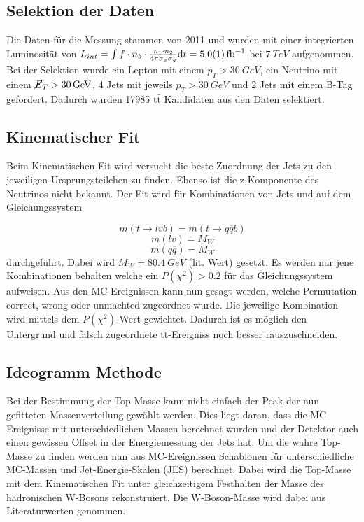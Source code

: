 \documentclass[a4paper]{article}
\begin{document}
\subsection{Selektion der Daten}
Die Daten für die Messung stammen von 2011 und wurden mit einer integrierten Luminosität von $L_{int} = \int f \cdot n_b \cdot \frac{n_1 \cdot n_2}{4 \pi \sigma_x \sigma_y} \mathrm{d}t = \SI{5.0 \pm 0.1}{fb^{-1}}$ bei $\SI{7}{TeV}$ aufgenommen. Bei der Selektion wurde ein Lepton mit einem $p_T > \SI{30}{GeV}$, ein Neutrino mit einem $\cancel{\it{E}}_{T} > \SI{30}{GeV}$, 4 Jets mit jeweils $p_T > \SI{30}{GeV}$ und 2 Jets mit einem B-Tag gefordert. Dadurch wurden 17985 $\textrm{t}\bar{\textrm{t}}$ Kandidaten aus den Daten selektiert.

\subsection{Kinematischer Fit}
Beim Kinematischen Fit wird versucht die beste Zuordnung der Jets zu den jeweiligen Ursprungsteilchen zu finden. Ebenso ist die z-Komponente des Neutrinos nicht bekannt. Der Fit wird für Kombinationen von Jets und auf dem Gleichungssystem

\begin{equation}
  m(t\rightarrow lvb) = m(t \rightarrow q \overline{q} b)
\end{equation}
\begin{equation}
  m(lv) = M_W
\end{equation}
\begin{equation}
  m(q \overline{q}) = M_W
\end{equation}
durchgeführt. Dabei wird $M_W = \SI{80.4}{GeV}$ (lit. Wert) gesetzt. Es werden nur jene Kombinationen behalten welche ein $P(\chi^2) > 0.2$ für das Gleichungssystem aufweisen. Aus den MC-Ereignissen kann nun gesagt werden, welche Permutation correct, wrong oder unmachted zugeordnet wurde. Die jeweilige Kombination wird mittels dem $P(\chi^2)$-Wert gewichtet. Dadurch ist es möglich den Untergrund und falsch zugeordnete $\textrm{t}\bar{\textrm{t}}$-Ereigniss noch besser rauszuschneiden.

\subsection{Ideogramm Methode}
Bei der Bestimmung der Top-Masse kann nicht einfach der Peak der nun gefitteten Massenverteilung gewählt werden. Dies liegt daran, dass die MC-Ereignisse mit unterschiedlichen Massen berechnet wurden und der Detektor auch einen gewissen Offset in der Energiemessung der Jets hat. Um die wahre Top-Masse zu finden werden nun aus MC-Ereignissen Schablonen für unterschiedliche MC-Massen und Jet-Energie-Skalen (JES) berechnet. Dabei wird die Top-Masse mit dem Kinematischen Fit unter gleichzeitigem Festhalten der Masse des hadronischen W-Bosons rekonstruiert. Die W-Boson-Masse wird dabei aus Literaturwerten genommen.
\end{document}
